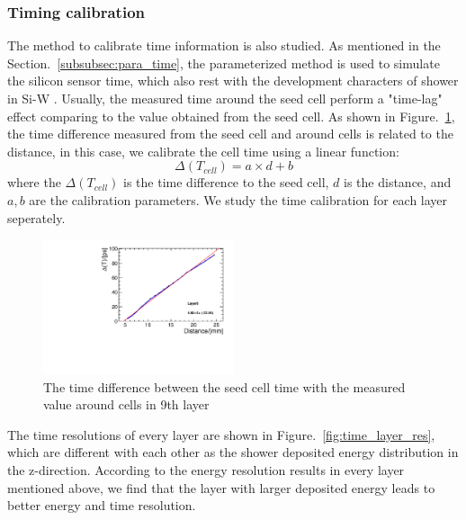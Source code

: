 


\subsubsection{Timing calibration}

The method to calibrate time information is also studied.
As mentioned in the Section.~\ref{subsubsec:para_time}, 
the parameterized method is used to simulate the silicon sensor time, 
which also rest with the development characters of shower in Si-W \ecal.
Usually, the measured time around the seed cell perform a "time-lag" effect comparing to the value obtained from the seed cell.
As shown in Figure.~\ref{fig:time_cali},
the time difference measured from the seed cell and around cells is related to the distance,
in this case, 
we calibrate the cell time using a linear function:
\begin{equation}
\Delta(T_{cell}) = a \times d + b
\end{equation}
where the $\Delta(T_{cell})$ is the time difference to the seed cell, 
$d$ is the distance,
and $a,b$ are the calibration parameters.
We study the time calibration for each layer seperately.

\begin{figure}[!thbp]
 \centering
\includegraphics[width=0.5\textwidth]{Figures/06_ECAL/time_cali_res/E_fraction_layers_9.pdf}
\caption{The time difference between the seed cell time with the measured value around cells in 9th layer} 
\label{fig:time_cali}
\end{figure}

The time resolutions of every layer are shown in Figure.~\ref{fig:time_layer_res},
which are different with each other as the shower deposited energy distribution in the z-direction.
According to the energy resolution results in every layer mentioned above, 
we find that the layer with larger deposited energy leads to better energy and time resolution.


